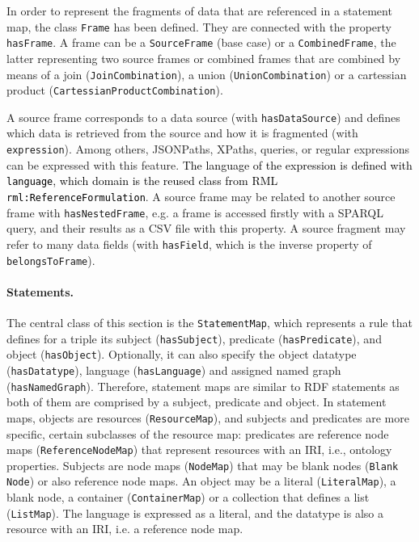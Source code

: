 In order to represent the fragments of data that are referenced in a statement map, the class \texttt{Frame} has been defined. They are connected with the property \texttt{hasFrame}. A frame can be a \texttt{SourceFrame} (base case) or a \texttt{CombinedFrame}, the latter representing two source frames or combined frames that are combined by means of a join (\texttt{JoinCombination}), a union (\texttt{UnionCombination}) or a cartessian product (\texttt{Cartessi\-anProductCombination}). 

A source frame corresponds to a data source (with \texttt{hasDataSource}) and defines which data is retrieved from the source and how it is fragmented (with \texttt{expression}). Among others, JSONPaths, XPaths, queries, or regular expressions can be expressed with this feature. \textcolor{black}{The language of the expression is defined with \texttt{language}, which domain is the reused class from RML \texttt{rml:ReferenceFormulation}}. A source frame may be related to another source frame with  \texttt{hasNest\-edFrame}, e.g. a frame is accessed firstly with a SPARQL query, and their results as a CSV file with this property. A source fragment may refer to many data fields (with \texttt{hasField}, which is the inverse property of \texttt{belongsToFrame}).


\noindent\paragraph{\textbf{Statements.}} The central class of this section is the \texttt{StatementMap}, which represents a rule that defines for a triple its subject (\texttt{hasSubject}), predicate (\texttt{hasPredicate}), and object (\texttt{hasObject}). Optionally, it can also specify the object datatype (\texttt{hasDatatype}), language (\texttt{hasLanguage}) and assigned named graph (\texttt{hasNamedGraph}). Therefore, statement maps are similar to RDF statements as both of them are comprised by a subject, predicate and object. In statement maps, objects are resources (\texttt{ResourceMap}), and subjects and predicates are more specific, certain subclasses of the resource map: predicates are reference node maps (\texttt{ReferenceNodeMap}) that represent resources with an IRI, i.e., ontology properties. Subjects are node maps (\texttt{NodeMap}) that may be blank nodes (\texttt{Blank Node}) or also reference node maps. An object may be a literal (\texttt{LiteralMap}), a blank node, a container (\texttt{ContainerMap}) or a collection that defines a list (\texttt{ListMap}). The language is expressed as a literal, and the datatype is also a resource with an IRI, i.e. a reference node map.

